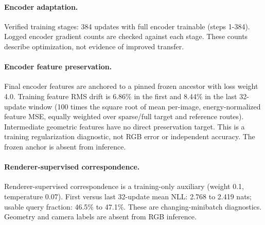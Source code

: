 \documentclass[10pt]{article}
\begin{document}
\paragraph{Encoder adaptation.} Verified training stages: 384 updates with full encoder trainable (steps 1-384). Logged encoder gradient counts are checked against each stage. These counts describe optimization, not evidence of improved transfer.

\paragraph{Encoder feature preservation.} Final encoder features are anchored to a pinned frozen ancestor with loss weight 4.0. Training feature RMS drift is 6.86\% in the first and 8.44\% in the last 32-update window (100 times the square root of mean per-image, energy-normalized feature MSE, equally weighted over sparse/full target and reference routes). Intermediate geometric features have no direct preservation target. This is a training regularization diagnostic, not RGB error or independent accuracy. The frozen anchor is absent from inference.

\paragraph{Renderer-supervised correspondence.} Renderer-supervised correspondence is a training-only auxiliary (weight 0.1, temperature 0.07). First versus last 32-update mean NLL: 2.768 to 2.419 nats; usable query fraction: 46.5\% to 47.1\%. These are changing-minibatch diagnostics. Geometry and camera labels are absent from RGB inference.
\end{document}
